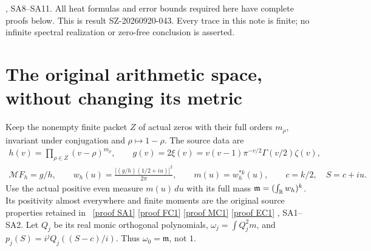 \documentclass[11pt]{article}
\begin{document}
{}, SA8--SA11. All heat formulas and error
bounds required here have complete proofs below.
This is result SZ-20260920-043. Every trace in this note is
finite; no infinite spectral realization or zero-free
conclusion is asserted.

\section{The original arithmetic space, without changing its metric}

Keep the nonempty finite packet \(Z\) of actual zeros with
their full orders \(m_\rho\), invariant under conjugation
and \(\rho\mapsto1-\rho\). The source data are
\begin{equation}\tag{NH1}\label{NH1}
\begin{gathered}
h(v)=\prod_{\rho\in Z}(v-\rho)^{m_\rho},\qquad
g(v)=2\xi(v)=v(v-1)\pi^{-v/2}\Gamma(v/2)\zeta(v),\\
\mathcal M F_h=g/h,\qquad
w_h(u)=\frac{|(g/h)(1/2+iu)|^2}{2\pi},\qquad
m(u)=w_h^{*k}(u),\qquad c=k/2,\quad S=c+iu .
\end{gathered}
\end{equation}
Use the actual positive even measure \(m(u)\,du\) with
its full mass
\(\mathfrak m=(\int_\mathbb R w_h)^k\). Its positivity almost
everywhere and finite moments are the original source
properties retained in \cite{NativeAction}%
~\href{https://github.com/KokunoYumeto/zeta-function-research-reader/blob/5992ad50c0f2a06921f1fcaded7b4e38097c0739/workbenches/splitzero-tandem/continuations/20260920-original-kernel-mixed-determinants/providers/NATIVE_SPECTRAL_ACTION.tex\#L31}{[proof SA1]} \href{https://github.com/KokunoYumeto/zeta-function-research-reader/blob/5992ad50c0f2a06921f1fcaded7b4e38097c0739/workbenches/splitzero-tandem/continuations/20260920-original-kernel-mixed-determinants/providers/SOURCE_FUNCTION_CLASS_CHECK.tex\#L24}{[proof FC1]} \href{https://github.com/KokunoYumeto/zeta-function-research-reader/blob/5992ad50c0f2a06921f1fcaded7b4e38097c0739/workbenches/splitzero-tandem/continuations/20260920-original-kernel-mixed-determinants/providers/RANK_ONE_METRIC_CURVATURE.tex\#L35}{[proof MC1]} \href{https://github.com/KokunoYumeto/zeta-function-research-reader/blob/5992ad50c0f2a06921f1fcaded7b4e38097c0739/workbenches/splitzero-tandem/continuations/20260920-original-kernel-mixed-determinants/providers/INDEPENDENT_ENDPOINT_CHECK.tex\#L28}{[proof EC1]}%
{}, SA1--SA2.
Let \(Q_j\) be its real monic orthogonal polynomials,
\(\omega_j=\int Q_j^2m\), and
\(p_j(S)=i^jQ_j((S-c)/i)\). Thus
\(\omega_0=\mathfrak m\), not \(1\).
\end{document}
